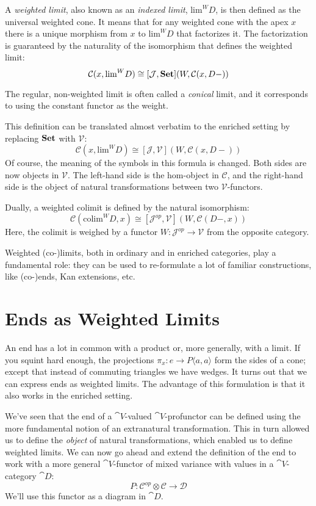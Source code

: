 \documentclass[DaoFP]{subfiles}
\begin{document}
A \emph{weighted limit}, also known as an \emph{indexed limit}, $\text{lim}^W D$, is then defined as the universal weighted cone. It means that for any weighted cone with the apex $x$ there is a unique morphism from $x$ to $\text{lim}^W D$ that factorizes it. The factorization is guaranteed by the naturality of the isomorphism that defines the weighted limit:
\[  \mathcal C(x, \text{lim}^W D) \cong [\mathcal J, \mathbf{Set}] (W, \mathcal C(x, D-)) \]

The regular, non-weighted limit is often called a \emph{conical} limit, and it corresponds to using the constant functor as the weight. 

This definition can be translated almost verbatim to the enriched setting by replacing $\mathbf{Set}$ with $\mathcal V$:
\[  \mathcal C(x, \text{lim}^W D) \cong [\mathcal J, \mathcal V] (W, \mathcal C(x, D-)) \]
Of course, the meaning of the symbols in this formula is changed. Both sides are now objects in $\mathcal V$. The left-hand side is the hom-object in $\mathcal C$, and the right-hand side is the object of natural transformations between two $\mathcal V$-functors.

Dually, a weighted colimit is defined by the natural isomorphism:
\[  \mathcal C(\text{colim}^W D, x) \cong [\mathcal J^{op}, \mathcal V] (W, \mathcal C(D-, x)) \]
Here, the colimit is weighed by a functor $W \colon \mathcal J^{op} \to \mathcal V$ from the opposite category.

Weighted (co-)limits, both in ordinary and in enriched categories, play a fundamental role: they can be used to re-formulate a lot of familiar constructions, like (co-)ends, Kan extensions, etc. 

\section{Ends as Weighted Limits}

An end has a lot in common with a product or, more generally, with a limit. If you squint hard enough, the projections $\pi_x \colon e \to P \langle a, a \rangle$ form the sides of a cone; except that instead of commuting triangles we have wedges. It turns out that we can express ends as weighted limits. The advantage of this formulation is that it also works in the enriched setting. 

We've seen that the end of a $\cat V$-valued $\cat V$-profunctor can be defined using the more fundamental notion of an extranatural transformation. This in turn allowed us to define the \emph{object} of natural transformations, which enabled us to define weighted limits. We can now go ahead and extend the definition of the end to work with a more general $\cat V$-functor of mixed variance with values in a $\cat V$-category $\cat D$:
\[ P \colon \mathcal C^{op} \otimes \mathcal C \to \mathcal D \]
We'll use this functor as a diagram in $\cat D$. 
\end{document}
